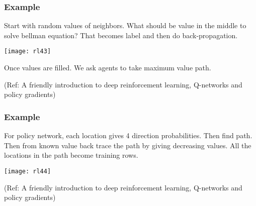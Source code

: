 \begin{frame}[fragile]\frametitle{Example}

Start with random values of neighbors. What should be value in the middle to solve bellman equation? That becomes label and then do back-propagation.

\begin{center}
\texttt{[image: rl43]}
\end{center}

Once values are filled. We ask agents to take maximum value path.

{\tiny (Ref: A friendly introduction to deep reinforcement learning, Q-networks and policy gradients)}

\end{frame}

\begin{frame}[fragile]\frametitle{Example}

For policy network, each location gives 4 direction probabilities. Then find path. Then from known value back trace the path by giving decreasing values. All the locations in the path become training rows.

\begin{center}
\texttt{[image: rl44]}
\end{center}


{\tiny (Ref: A friendly introduction to deep reinforcement learning, Q-networks and policy gradients)}

\end{frame}